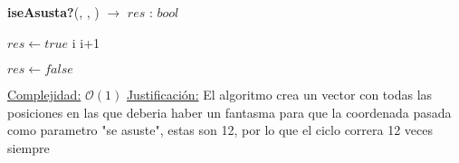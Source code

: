 \documentclass[10pt, a4paper]{article}
\begin{document}
\begin{Algoritmos}
\begin{algorithm}[H]{\textbf{iseAsusta?}(, , ) $\to$ $res$ : $bool$}
\begin{algorithmic}
                        \State $res \gets true$
                    \EndIf
                    \State i \gets i+1
            \EndIf

			\EndWhile
			
			\State $res \gets false$
    	
		\medskip
		\Statex \underline{Complejidad:} $\mathcal{O}(1)$
		\Statex \underline{Justificación:} El algoritmo crea un vector con todas las posiciones en las que deberia haber un fantasma para que la coordenada pasada como parametro "se asuste", estas son 12, por lo que el ciclo correra 12 veces siempre
    \end{algorithmic}
\end{algorithm}	

\end{Algoritmos}
\end{document}
